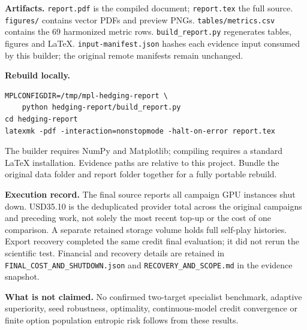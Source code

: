 \documentclass[11pt,a4paper]{article}
\begin{document}
\textbf{Artifacts.} \texttt{report.pdf} is the compiled document; \texttt{report.tex} the full source. \texttt{figures/} contains vector PDFs and preview PNGs. \texttt{tables/metrics.csv} contains the 69 harmonized metric rows. \texttt{build\_report.py} regenerates tables, figures and LaTeX. \texttt{input-manifest.json} hashes each evidence input consumed by this builder; the original remote manifests remain unchanged.

\textbf{Rebuild locally.}
\begin{verbatim}
MPLCONFIGDIR=/tmp/mpl-hedging-report \
    python hedging-report/build_report.py
cd hedging-report
latexmk -pdf -interaction=nonstopmode -halt-on-error report.tex
\end{verbatim}
The builder requires NumPy and Matplotlib; compiling requires a standard LaTeX installation. Evidence paths are relative to this project. Bundle the original data folder and report folder together for a fully portable rebuild.

\textbf{Execution record.} The final source reports all campaign GPU instances shut down. USD35.10 is the deduplicated provider total across the original campaigns and preceding work, not solely the most recent top-up or the cost of one comparison. A separate retained storage volume holds full self-play histories. Export recovery completed the same credit final evaluation; it did not rerun the scientific test. Financial and recovery details are retained in \texttt{FINAL\_COST\_AND\_SHUTDOWN.json} and \texttt{RECOVERY\_AND\_SCOPE.md} in the evidence snapshot.

\textbf{What is not claimed.} No confirmed two-target specialist benchmark, adaptive superiority, seed robustness, optimality, continuous-model credit convergence or finite option population entropic risk follows from these results.
\end{document}
